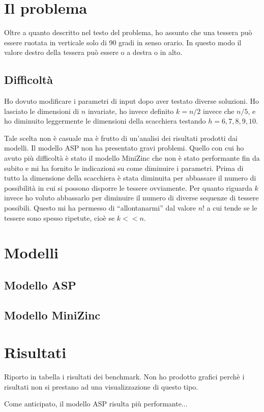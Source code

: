 \documentclass[12pt,a4paper,english,italian]{article}
\begin{document}
\section{Il problema}
Oltre a quanto descritto nel testo del problema, ho assunto che una tessera può essere ruotata in verticale solo di 90 gradi in senso orario. In questo modo il valore destro della tessera può essere o a destra o in alto.

\subsection{Difficoltà}
Ho dovuto modificare i parametri di input dopo aver testato diverse soluzioni. Ho lasciato le dimensioni di $n$ invariate, ho invece definito $k = n/2$ invece che $n/5$, e ho diminuito leggermente le dimensioni della scacchiera testando $h = 6,7,8,9,10$.

Tale scelta non è casuale ma è frutto di un'analisi dei risultati prodotti dai modelli. Il modello ASP non ha presentato gravi problemi. Quello con cui ho avuto più difficoltà è stato il modello MiniZinc che non è stato performante fin da subito e mi ha fornito le indicazioni su come diminuire i parametri. Prima di tutto la dimensione della scacchiera è stata diminuita per abbassare il numero di possibilità in cui si possono disporre le tessere ovviamente. Per quanto riguarda $k$ invece ho voluto abbassarlo per diminuire il numero di diverse sequenze di tessere possibili. Questo mi ha permesso di ``allontanarmi'' dal valore $n!$ a cui tende se le tessere sono spesso ripetute, cioè se $k << n$.


\section{Modelli}

\subsection{Modello ASP}



\subsection{Modello MiniZinc}




\section{Risultati}
Riporto in tabella i risultati dei benchmark. Non ho prodotto grafici perchè i risultati non si prestano ad una visualizzazione di questo tipo.

Come anticipato, il modello ASP risulta più performante...
\end{document}

